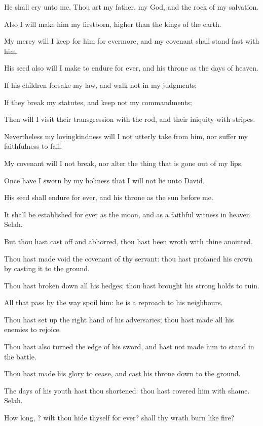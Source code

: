 \verse He shall cry unto me, Thou art my father, my God, and the rock of my salvation.

\verse Also I will make him my firstborn, higher than the kings of the earth.

\verse My mercy will I keep for him for evermore, and my covenant shall stand fast with him.

\verse His seed also will I make to endure for ever, and his throne as the days of heaven.

\verse If his children forsake my law, and walk not in my judgments;

\verse If they break my statutes, and keep not my commandments;

\verse Then will I visit their transgression with the rod, and their iniquity with stripes.

\verse Nevertheless my lovingkindness will I not utterly take from him, nor suffer my faithfulness to fail.

\verse My covenant will I not break, nor alter the thing that is gone out of my lips.

\verse Once have I sworn by my holiness that I will not lie unto David.

\verse His seed shall endure for ever, and his throne as the sun before me.

\verse It shall be established for ever as the moon, and as a faithful witness in heaven. Selah.

\verse But thou hast cast off and abhorred, thou hast been wroth with thine anointed.

\verse Thou hast made void the covenant of thy servant: thou hast profaned his crown by casting it to the ground.

\verse Thou hast broken down all his hedges; thou hast brought his strong holds to ruin.

\verse All that pass by the way spoil him: he is a reproach to his neighbours.

\verse Thou hast set up the right hand of his adversaries; thou hast made all his enemies to rejoice.

\verse Thou hast also turned the edge of his sword, and hast not made him to stand in the battle.

\verse Thou hast made his glory to cease, and cast his throne down to the ground.

\verse The days of his youth hast thou shortened: thou hast covered him with shame. Selah.

\verse How long, \LORD? wilt thou hide thyself for ever? shall thy wrath burn like fire?


